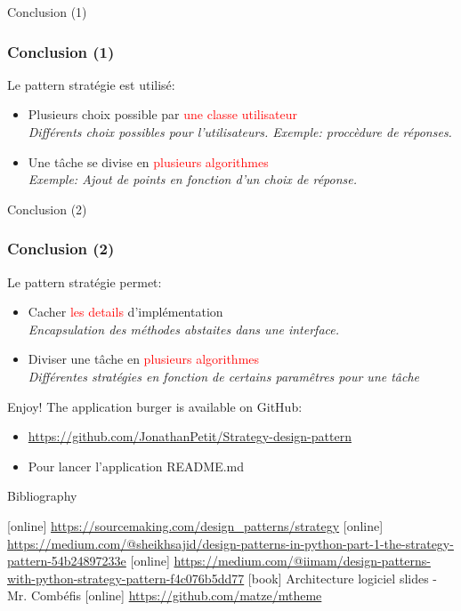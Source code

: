 \documentclass{beamer}
\begin{document}
  \begin{frame}{Conclusion (1)}
    \frametitle{Conclusion (1)}
    Le pattern stratégie est utilisé:
    \begin{itemize}
      \item Plusieurs choix possible par  \textcolor{red}{une classe utilisateur}\\
      \textit{Différents choix possibles pour l'utilisateurs. Exemple: proccèdure de réponses.}
      \item Une tâche se divise en  \textcolor{red}{plusieurs algorithmes} \\
      \textit{Exemple: Ajout de points en fonction d'un choix de réponse.}
    \end{itemize}
  \end{frame}
  
    \begin{frame}{Conclusion (2)}
    \frametitle{Conclusion (2)}
    Le pattern stratégie permet:
    \begin{itemize}
      \item Cacher \textcolor{red}{les details} d'implémentation \\
      \textit{Encapsulation des méthodes abstaites dans une interface.}
      \item Diviser une tâche en \textcolor{red}{plusieurs algorithmes} \\
      \textit{Différentes stratégies en fonction de certains paramêtres pour une tâche}
    \end{itemize}
  \end{frame}

  \appendix

  \begin{frame}{Enjoy!}
    The application burger is available on GitHub:
    \begin{itemize}
      \item \url{https://github.com/JonathanPetit/Strategy-design-pattern}
      \item Pour lancer l'application README.md
    \end{itemize}
  \end{frame}

  \begin{frame}[allowframebreaks]{Bibliography}
    \begin{thebibliography}{9}
      [online]
       \url{https://sourcemaking.com/design_patterns/strategy}
      [online]
       \url{https://medium.com/@sheikhsajid/design-patterns-in-python-part-1-the-strategy-pattern-54b24897233e}
      [online]
       \url{https://medium.com/@iimam/design-patterns-with-python-strategy-pattern-f4c076b5dd77}
      [book]
       Architecture logiciel slides - Mr. Comb\'efis
      [online]
       \url{https://github.com/matze/mtheme}

    \end{thebibliography}
  \end{frame}
\end{document}
